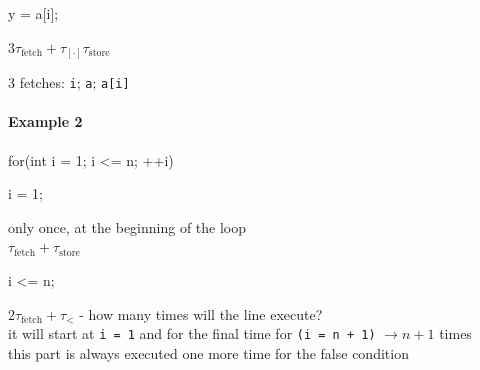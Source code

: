 \noindent
\begin{minipage}{0.05\textwidth}
    \phantom{text}
\end{minipage}
\begin{minipage}{0.2\textwidth}
    \begin{tightcode}
y = a[i];
    \end{tightcode}
\end{minipage}
\begin{minipage}{0.22\textwidth}
    \begin{mybox}[Periwinkle]{}
        $3\tau_{\text{fetch}} + \tau_{[\cdot]} \tau_{\text{store}}$
    \end{mybox}
\end{minipage}
\begin{minipage}{0.25\textwidth}
    \begin{mybox}[Gray]{}
        3 fetches: \texttt{i}; \texttt{a}; \texttt{a[i]}
    \end{mybox}
\end{minipage}

\paragraph*{Example 2}

\begin{center}
    \begin{minipage}{0.33\textwidth}
        \begin{tightcode}
for(int i = 1; i <= n; ++i)
        \end{tightcode}
    \end{minipage}
\end{center}

\noindent
\begin{minipage}{0.15\textwidth}
    \begin{tightcode}
i = 1;
    \end{tightcode}
\end{minipage}
\begin{minipage}{0.5\textwidth}
    only once, at the beginning of the loop\\
    $\tau_{\text{fetch}} + \tau_{\text{store}}$
\end{minipage}

\vspace{0.35cm}

\noindent
\begin{minipage}{0.15\textwidth}
    \begin{tightcode}
i <= n;
    \end{tightcode}
\end{minipage}
\begin{minipage}{0.75\textwidth}
    $2\tau_{\text{fetch}} + \tau_{<}$ - how many times will the line execute?\\
    it will start at \texttt{i = 1} and for the final time for \texttt{(i = n + 1)} $\rightarrow n + 1$ times\\
    this part is always executed one more time for the false condition
\end{minipage}

